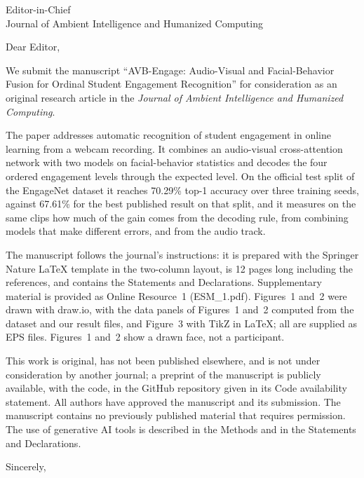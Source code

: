 \documentclass[11pt]{letter}
\begin{document}
\begin{letter}{Editor-in-Chief\\Journal of Ambient Intelligence and Humanized Computing}
\opening{Dear Editor,}

We submit the manuscript ``AVB-Engage: Audio-Visual and Facial-Behavior Fusion for Ordinal Student Engagement
Recognition'' for consideration as an original research article in the \emph{Journal of Ambient Intelligence and
Humanized Computing}.

The paper addresses automatic recognition of student engagement in online learning from a webcam recording. It
combines an audio-visual cross-attention network with two models on facial-behavior statistics and decodes the four
ordered engagement levels through the expected level. On the official test split of the EngageNet dataset it reaches
70.29\% top-1 accuracy over three training seeds, against 67.61\% for the best published result on that split, and it
measures on the same clips how much of the gain comes from the decoding rule, from combining models that make different
errors, and from the audio track.

The manuscript follows the journal's instructions: it is prepared with the Springer Nature \LaTeX{} template in the
two-column layout, is 12 pages long including the references, and contains the Statements and Declarations. Supplementary material is provided as Online Resource~1 (ESM\_1.pdf). Figures~1 and~2 were drawn with
draw.io, with the data panels of Figures~1 and~2 computed from the dataset and our result files, and Figure~3 with TikZ in \LaTeX; all are
supplied as EPS files. Figures~1 and~2 show a drawn face, not a participant.

This work is original, has not been published elsewhere, and is not under consideration by another journal; a
preprint of the manuscript is publicly available, with the code, in the GitHub repository given in its Code
availability statement. All
authors have approved the manuscript and its submission. The manuscript contains no previously published material
that requires permission. The use of generative AI tools is described in the Methods and in the Statements and
Declarations.

\closing{Sincerely,}
\end{letter}
\end{document}
